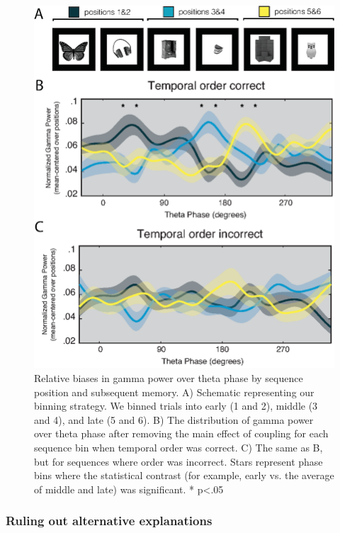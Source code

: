 \begin{figure}
  \centering
  \includegraphics[width=\textwidth]{figures/chapter3_figure3.eps}
  \caption[Relative biases in gamma power over theta phase by sequence position and subsequent memory]{Relative biases in gamma power over theta phase by sequence position and subsequent memory.  A) Schematic representing our binning strategy.  We binned trials into early (1 and 2), middle (3 and 4), and late (5 and 6).  B) The distribution of gamma power over theta phase after removing the main effect of coupling for each sequence bin when temporal order was correct.  C) The same as B, but for sequences where order was incorrect. Stars represent phase bins where the statistical contrast (for example, early vs. the average of middle and late) was significant.  * p<.05}
  \label{chapter3_figure3}
\end{figure}

\subsubsection{Ruling out alternative
explanations}\label{ruling-out-alternative-explanations}

